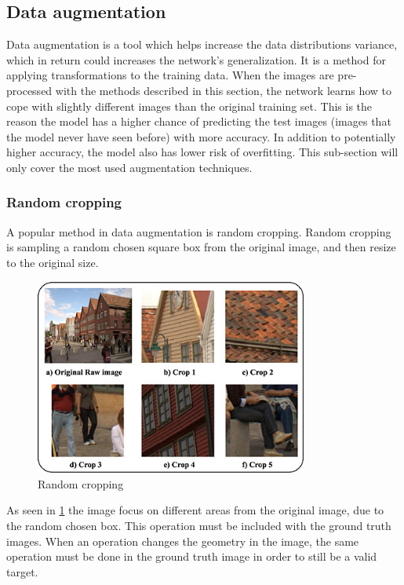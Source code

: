 \documentclass[USenglish]{ifimaster}  %
\begin{document}
\subsection{Data augmentation}
Data augmentation is a tool which helps increase the data distributions variance, which in return could increases the network's generalization. It is a method for applying transformations to the training data. When the images are pre-processed with the methods described in this section, the network learns how to cope with slightly different images than the original training set. This is the reason the model has a higher chance of predicting the test images (images that the model never have seen before) with more accuracy. In addition to potentially higher accuracy, the model also has lower risk of overfitting. This sub-section will only cover the most used augmentation techniques.  
\subsubsection{Random cropping}
A popular method in data augmentation is random cropping. Random cropping is sampling a random chosen square box from the original image, and then resize to the original size.
\begin{figure}[ht]
    \centering
    \includegraphics[width=0.8\textwidth]{bilder/random_cropping.png}
    \caption{Random cropping \cite{website:random_cropping}}
    \label{fig:random_cropping}
\end{figure}
As seen in \cref{fig:random_cropping} the image focus on different areas from the original image, due to the random chosen box. This operation must be included with the ground truth images. When an operation changes the geometry in the image, the same operation must be done in the ground truth image in order to still be a valid target. 
\end{document}
